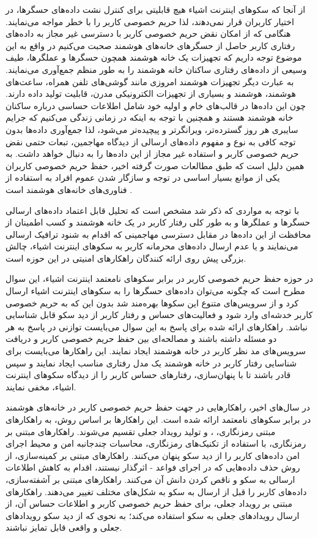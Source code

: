 از آنجا که ﺳﮑﻮﻫﺎی اینترنت اشیاء ﻫﯿﭻ ﻗﺎﺑﻠﯿﺘﯽ ﺑﺮای ﮐﻨﺘﺮل ﻧﺸﺖ دادهﻫﺎی حسگرها، در اﺧﺘﯿﺎر ﮐﺎرﺑﺮان ﻗﺮار ﻧﻤﯽدﻫند، لذا حریم خصوصی کاربر را با خطر مواجه می‌نمایند. هنگامی که از امکان نقض حریم خصوصی کاربر با دسترسی غیر مجاز به داده‌های رفتاری کاربر حاصل از حسگرهای خانه‌های هوشمند صحبت می‌کنیم در واقع به این موضوع توجه داریم که تجهیزات یک خانه هوشمند همچون حسگرها و عملگرها، طیف وسیعی از داده‌های رفتاری ساکنان خانه هوشمند را به طور منظم جمع‌آوری می‌نمایند. به عبارت دیگر تجهیزات هوشمند امروزی مانند گوشی‌های تلفن همراه، ساعت‌های هوشمند،  هوشمند و بسیاری از تجهیزات الکترونیکی مدرن، قابلیت تولید داده دارند. چون این داده‌ها در قالب‌های خام و اولیه خود شامل اطلاعات حساسی درباره ساکنان خانه هوشمند هستند و همچنین با توجه به اينکه در زمانی زندگی می‌کنیم که جرایم سایبری هر روز گسترده‌تر، ويرانگرتر و پيچيده‌تر می‌شود، لذا جمع‌آوری داده‌ها بدون توجه کافی به نوع و مفهوم داده‌های ارسالی از دیدگاه مهاجمین، تبعات حتمی نقض حریم خصوصی کاربر و استفاده غیر مجاز از این داده‌ها را به دنبال خواهد داشت. به همین دلیل است که طبق مطالعات صورت گرفته اخیر، حفظ حریم خصوصی کاربران یکی از موانع بسیار اساسی در توجه و سازگار شدن عموم افراد به استفاده از فناوری‌های خانه‌های هوشمند است \cite{x13}. 

با توجه به مواردی که ذکر شد مشخص است که تحلیل قابل اعتماد داده‌های ارسالی حسگرها و عملگرها و به طور کلی رفتار کاربر در یک خانه هوشمند و کسب اطمینان از محافظت از این داده‌ها در مقابل دسترسی مهاجمینی که اقدام به شنود ترافیک ارسالی می‌نمایند و یا عدم ارسال داده‌های محرمانه کاربر به سکوهای اینترنت اشیاء، چالش بزرگی پیش روی ارائه کنندگان راهکارهای امنیتی در این حوزه است.

در حوزه حفظ حریم خصوصی کاربر در برابر سکوهای نامعتمد اینترنت اشیاء، این سوال مطرح است که چگونه می‌توان داده‌های حسگرها را به سکوهای اینترنت اشیاء ارسال کرد و از سرویس‌های متنوع این سکوها بهره‌مند شد بدون این که به حریم خصوصی کاربر خدشه‌ای وارد شود و فعالیت‌های حساس و رفتار کاربر از دید سکو قابل شناسایی نباشد. راهکارهای ارائه شده برای پاسخ به اين سوال می‌بایست توازنی در پاسخ به هر دو مسئله داشته باشند و مصالحه‌ای بین حفظ حریم خصوصی کاربر و دریافت سرویس‌های مد نظر کاربر در خانه هوشمند ایجاد نمایند. این راهکارها می‌بایست برای شناسایی رفتار کاربر در خانه هوشمند یک مدل رفتاری مناسب ایجاد نمایند و سپس قادر باشند تا با پنهان‌سازی، رفتارهای حساس کاربر را از دیدگاه سکوهای اینترنت اشیاء، مخفی نمایند. 

در سال‌های اخیر، راهکارهایی در جهت حفظ حریم خصوصی کاربر در خانه‌های هوشمند در برابر سکوهای نامعتمد ارائه شده است. این راهکارها بر اساس روش، به راهکارهای مبتنی رمزنگاری، ،  و تولید رویداد جعلی تقسیم می‌شوند. راهکارهای مبتنی بر رمزنگاری، با استفاده از تکنیک‌های رمزنگاری، محاسبات چندجانبه امن و محیط اجرای امن داده‌های کاربر را از دید سکو پنهان می‌کنند. راهکارهای مبتنی بر کمینه‌سازی، از روش حذف داده‌هایی که در اجرای فواعد - اثرگذار نیستند، اقدام به کاهش اطلاعات ارسالی به سکو و ناقص کردن دانش آن می‌کنند. راهکارهای مبتنی بر آشفته‌سازی، داده‌های کاربر را قبل از ارسال به سکو به شکل‌های مختلف تغییر می‌دهند. راهکارهای مبتنی بر رویداد جعلی، برای حفظ حریم خصوصی کاربر و اطلاعات حساس آن، از ارسال رویدادهای جعلی به سکو استفاده می‌کند؛ به نحوی که از دید سکو رویدادهای جعلی و واقعی قابل تمایز نباشند.

